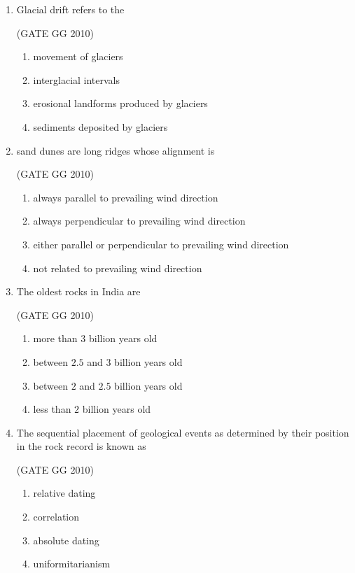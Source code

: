 \documentclass[journal]{IEEEtran}
\begin{document}
\begin{enumerate}
\item  Glacial drift refers to the

\hfill (GATE GG 2010)

\begin{enumerate}
\item movement of glaciers
\item interglacial intervals
\item erosional landforms produced by glaciers
\item sediments deposited by glaciers
\end{enumerate}


\item  sand dunes are long ridges whose alignment is

\hfill (GATE GG 2010)

\begin{enumerate}
\item always parallel to prevailing wind direction
\item always perpendicular to prevailing wind direction
\item either parallel or perpendicular to prevailing wind direction
\item not related  to prevailing wind direction
\end{enumerate}


\item  The oldest rocks in India are

\hfill (GATE GG 2010)

\begin{enumerate}
\item more than $3$ billion years old
\item between $2.5$ and $3$ billion years old
\item between $2$ and $2.5$ billion years old
\item less than $2$ billion years old
\end{enumerate}


\item  The sequential placement of geological events as determined by their position in the rock record is known as

\hfill (GATE GG 2010) 
\begin{multicols}{2}

\begin{enumerate}
\item relative dating
\item correlation
\item absolute dating
\item uniformitarianism
\end{enumerate}
\end{multicols}


\end{enumerate}
\end{document}
